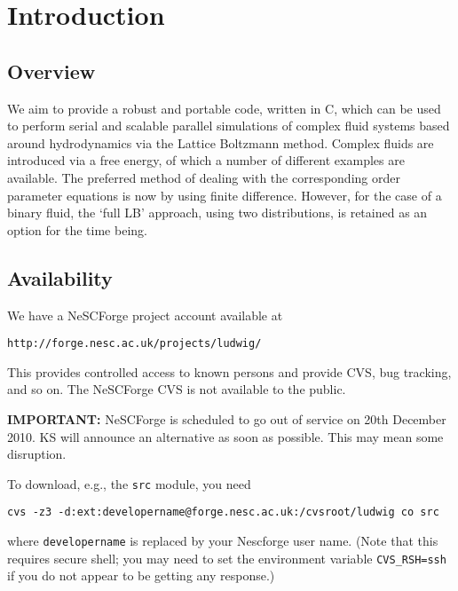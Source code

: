 %
%
%
%
%
%

\section{Introduction}

\subsection{Overview}

We aim to provide a robust and portable code, written in C, which
can be used to perform serial and scalable parallel simulations of
complex fluid systems based around hydrodynamics via the Lattice
Boltzmann method. Complex fluids are introduced via a free energy,
of which a number of different examples are available. The preferred
method of dealing with the corresponding order parameter equations
is now by using finite difference. However, for the case of a binary
fluid, the `full LB' approach, using two distributions, is retained
as an option for the time being.

\subsection{Availability}

We have a NeSCForge project account available at

\texttt{http://forge.nesc.ac.uk/projects/ludwig/}

This provides controlled access to known persons and provide CVS, bug
tracking, and so on. The NeSCForge CVS is not available to the public.

\textbf{IMPORTANT:} NeSCForge is scheduled to go out of service on 20th
December 2010. KS will announce an alternative as soon as possible.
This may mean some disruption.

To download, e.g., the \texttt{src} module, you need
\begin{verbatim}
cvs -z3 -d:ext:developername@forge.nesc.ac.uk:/cvsroot/ludwig co src
\end{verbatim}
where \texttt{developername} is replaced by your Nescforge user name.
(Note that this requires secure shell; you may need to set the
environment variable \texttt{CVS\_RSH=ssh} if you do not appear
to be getting any response.)


